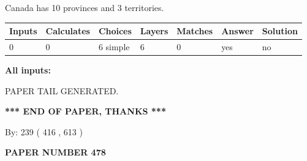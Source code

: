 \documentclass[12pt]{article}
\begin{document}
 
\noindent{}
 
 
Canada has 10  provinces and 3 territories.
 
 
\noindent{}
 
 
   
   
   
   
\noindent\begin{tabular}{|l|l|l|l|l|l|l|}
 \hline
Inputs & Calculates & Choices & Layers & Matches & Answer & Solution \\ \hline
 0  & 
 0  & 
 6
  simple  
  & 
 6  & 
 0  & 
  yes & 
  no 
  \\ \hline
 \end{tabular}
   
   
   
   
\noindent{}
   
   
   
   
\noindent\vspace{0.1in}\hspace{-0.08in} {\textbf{\Large{All inputs: }}}
   
   
   
   
   
   
 \vspace{0.2in}
 
   
   
\vspace{2.0in} PAPER TAIL GENERATED.
   
   
   
   
\vspace{1.0in} 
{\textbf{\large{ *** END OF PAPER, THANKS *** }}} 
   
   
\hspace{1.0in} By: 
 239 ( 416 ,  613 )
   
   
   
   
\newpage 
\setcounter{page}{ 
   478001 } 
   
   
   
   
 {\textbf{ \Large{ PAPER NUMBER  478  }}}
   
   
\vspace{0.2in}
   
   
   
\end{document}
